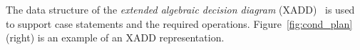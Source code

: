 \documentclass{article} %
\begin{document}

The data structure of the \emph{extended algebraic decision diagram}
(XADD)~\cite{sanner_uai11} is used to support case statements and the
required operations.  Figure~\ref{fig:cond_plan} (right) 
is an example of an XADD representation.

\end{document}
